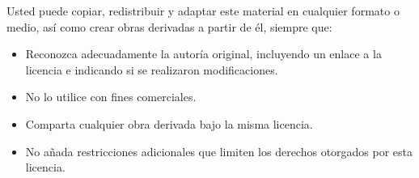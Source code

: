 \documentclass[graybox,envcountchap,sectrefs,a4paper,intlimits]{svmono}
\begin{document}
\noindent
Usted puede copiar, redistribuir y adaptar este material en cualquier
formato o medio, así como crear obras derivadas a partir de él,
siempre que:

\begin{itemize}
    \item

          Reconozca adecuadamente la autoría original, incluyendo un
          enlace a la licencia e indicando si se realizaron
          modificaciones.

    \item

          No lo utilice con fines comerciales.

    \item

          Comparta cualquier obra derivada bajo la misma licencia.

    \item

          No añada restricciones adicionales que limiten los derechos
          otorgados por esta \linebreak licencia.
\end{itemize}

\frontmatter





% 
\tableofcontents
% 

\mainmatter




\backmatter
% 
% 
\printindex
\end{document}
